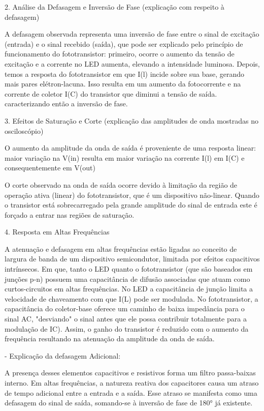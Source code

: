 2. Análise da Defasagem e Inversão de Fase (explicação com respeito à defasagem)

\noindent\hspace{.3cm}A defasagem observada representa uma inversão de fase entre o sinal de excitação (entrada) e o sinal recebido (saída), que pode ser explicado pelo princípio de funcionamento do fototransistor: primeiro, ocorre o aumento da tensão de excitação e a corrente no LED aumenta, elevando a intensidade luminosa. Depois, temos a resposta do fototransistor em que I(l) incide sobre sua base, gerando mais pares elétron-lacuna. Isso resulta em um aumento da fotocorrente e na corrente de coletor I(C) do transistor que diminui a tensão de saída. caracterizando então a inversão de fase.

3. Efeitos de Saturação e Corte (explicação das amplitudes de onda mostradas no osciloscópio)


\noindent\hspace{.3cm}O aumento da amplitude da onda de saída é proveniente de uma resposta linear: maior variação na V(in) resulta em maior variação na corrente I(l) em I(C) e consequentemente em V(out)

\noindent\hspace{.3cm}O corte observado na onda de saída ocorre devido à limitação da região de operação ativa (linear) do fototransistor, que é um dispositivo não-linear. Quando o transistor está sobrecarregado pela grande amplitude do sinal de entrada este é forçado a entrar nas regiões de saturação.

4. Resposta em Altas Frequências

\noindent\hspace{.3cm}A atenuação e defasagem em altas frequências estão ligadas ao conceito de largura de banda de um dispositivo semicondutor, limitada por efeitos capacitivos intrínsecos. Em que, tanto o LED quanto o fototransistor (que são baseados em junções p-n) possuem uma capacitância de difusão associadas que atuam como curtos-circuitos em altas frequências. No LED a capacitância de junção limita a velocidade de chaveamento com que I(L) pode ser modulada. No fototransistor, a capacitância do coletor-base oferece um caminho de baixa impedância para o sinal AC, "desviando" o sinal antes que ele possa contribuir totalmente para a modulação de IC). Assim, o ganho do transistor  é reduzido com o aumento da frequência resultando na atenuação da amplitude da onda de saída.

\noindent- Explicação da defasagem Adicional:

\noindent\hspace{.3cm}A presença desses elementos capacitivos e resistivos forma um filtro passa-baixas interno. Em altas frequências, a natureza reativa dos capacitores causa um atraso de tempo adicional entre a entrada e a saída. Esse atraso se manifesta como uma defasagem do sinal de saída, somando-se à inversão de fase de 180° já existente.

\vspace{.28cm}